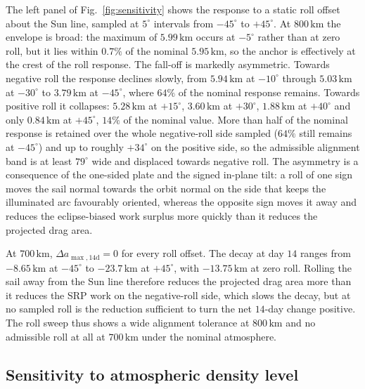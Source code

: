 \noindent The left panel of Fig.~\ref{fig:sensitivity} shows the response to a static roll offset about the Sun line, sampled at \(5^\circ\) intervals from \(-45^\circ\) to \(+45^\circ\). At \(800\,\mathrm{km}\) the envelope is broad: the maximum of \(5.99\,\mathrm{km}\) occurs at \(-5^\circ\) rather than at zero roll, but it lies within \(0.7\%\) of the nominal \(5.95\,\mathrm{km}\), so the anchor is effectively at the crest of the roll response. The fall-off is markedly asymmetric. Towards negative roll the response declines slowly, from \(5.94\,\mathrm{km}\) at \(-10^\circ\) through \(5.03\,\mathrm{km}\) at \(-30^\circ\) to \(3.79\,\mathrm{km}\) at \(-45^\circ\), where \(64\%\) of the nominal response remains. Towards positive roll it collapses: \(5.28\,\mathrm{km}\) at \(+15^\circ\), \(3.60\,\mathrm{km}\) at \(+30^\circ\), \(1.88\,\mathrm{km}\) at \(+40^\circ\) and only \(0.84\,\mathrm{km}\) at \(+45^\circ\), \(14\%\) of the nominal value. More than half of the nominal response is retained over the whole negative-roll side sampled (\(64\%\) still remains at \(-45^\circ\)) and up to roughly \(+34^\circ\) on the positive side, so the admissible alignment band is at least \(79^\circ\) wide and displaced towards negative roll. The asymmetry is a consequence of the one-sided plate and the signed in-plane tilt: a roll of one sign moves the sail normal towards the orbit normal on the side that keeps the illuminated arc favourably oriented, whereas the opposite sign moves it away and reduces the eclipse-biased work surplus more quickly than it reduces the projected drag area.
\vspace{5pt}
\par\noindent At \(700\,\mathrm{km}\), \(\Delta a_{\max,14\mathrm{d}} = 0\) for every roll offset. The decay at day \(14\) ranges from \(-8.65\,\mathrm{km}\) at \(-45^\circ\) to \(-23.7\,\mathrm{km}\) at \(+45^\circ\), with \(-13.75\,\mathrm{km}\) at zero roll. Rolling the sail away from the Sun line therefore reduces the projected drag area more than it reduces the SRP work on the negative-roll side, which slows the decay, but at no sampled roll is the reduction sufficient to turn the net \(14\)-day change positive. The roll sweep thus shows a wide alignment tolerance at \(800\,\mathrm{km}\) and no admissible roll at all at \(700\,\mathrm{km}\) under the nominal atmosphere.

\vspace{5pt}
\subsection{\textbf{Sensitivity to atmospheric density level}}

